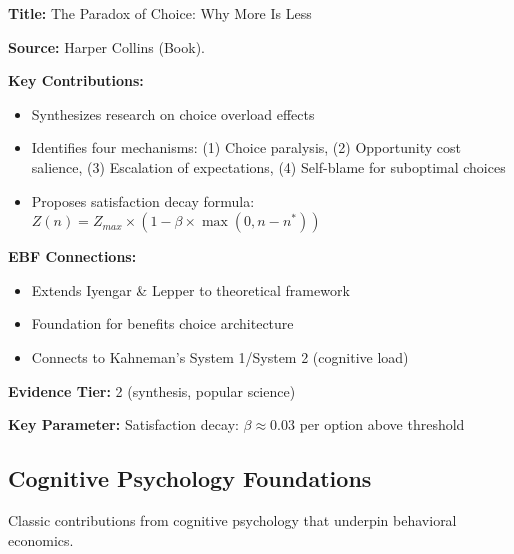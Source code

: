 \begin{tcolorbox}[colback=yellow!5!white,colframe=yellow!75!black,title=Key Paper: Schwartz (2004)]
\textbf{Title:} The Paradox of Choice: Why More Is Less

\textbf{Source:} Harper Collins (Book).

\textbf{Key Contributions:}
\begin{itemize}
    \item Synthesizes research on choice overload effects
    \item Identifies four mechanisms: (1) Choice paralysis, (2) Opportunity cost salience, (3) Escalation of expectations, (4) Self-blame for suboptimal choices
    \item Proposes satisfaction decay formula: $Z(n) = Z_{max} \times (1 - \beta \times \max(0, n - n^*))$
\end{itemize}

\textbf{EBF Connections:}
\begin{itemize}
    \item Extends Iyengar \& Lepper to theoretical framework
    \item Foundation for benefits choice architecture
    \item Connects to Kahneman's System 1/System 2 (cognitive load)
\end{itemize}

\textbf{Evidence Tier:} 2 (synthesis, popular science)

\textbf{Key Parameter:} Satisfaction decay: $\beta \approx 0.03$ per option above threshold
\end{tcolorbox}

\subsection{Cognitive Psychology Foundations}
\label{subsec:ot-cognitive}

Classic contributions from cognitive psychology that underpin behavioral economics.


